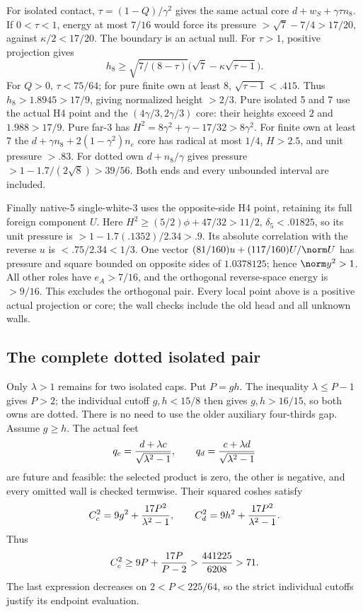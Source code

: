 For isolated contact, \(\tau=(1-Q)/\gamma^2\) gives the same
actual core \(d+w_S+\gamma\tau n_8\).
If \(0<\tau<1\), energy at most \(7/16\) would force its
pressure \(>\sqrt7-7/4>17/20\), against
\(\kappa/2<17/20\).  The boundary is an actual null.
For \(\tau>1\), positive projection gives
\[
 h_8\ge\sqrt{7/(8-\tau)}
               \bigl(\sqrt7-\kappa\sqrt{\tau-1}\bigr).
\]
For \(Q>0\), \(\tau<75/64\); for pure finite own at least 8,
\(\sqrt{\tau-1}<.415\).
Thus \(h_8>1.8945>17/9\), giving normalized height \(>2/3\).
Pure isolated 5 and 7 use the actual H4 point and the
\((4\gamma/3,2\gamma/3)\) core: their heights exceed
\(2\) and \(1.988>17/9\).
Pure far-3 has \(H^2=8\gamma^2+\gamma-17/32>8\gamma^2\).
For finite own at least 7 the
\(d+\gamma n_8+2(1-\gamma^2)n_e\) core has radical
at most \(1/4\), \(H>2.5\), and unit pressure \(>.83\).
For dotted own \(d+n_8/\gamma\) gives pressure
\(>1-1.7/(2\sqrt8)>39/56\).
Both ends and every unbounded interval are included.

Finally native-5 single-white-3 uses the opposite-side H4 point,
retaining its full foreign component \(U\).
Here \(H^2\ge(5/2)\phi+47/32>11/2\),
\(\delta_5<.01825\), so its unit pressure is
\(>1-1.7(.1352)/2.34>.9\).
Its absolute correlation with the reverse \(u\) is
\(<.75/2.34<1/3\).
One vector
\((81/160)u+(117/160)U/\norm U\)
has pressure and square bounded on opposite sides of \(1.0378125\);
hence \(\norm y^2>1\).
All other roles have \(e_A>7/16\), and the orthogonal
reverse-space energy is \(>9/16\).
This excludes the orthogonal pair.  Every local point above is
a positive actual projection or core; the wall checks include
the old head and all unknown walls.

\subsection{The complete dotted isolated pair}
\label{app:D18isolateddotted}

Only \(\lambda>1\) remains for two isolated caps.
Put \(P=gh\).  The inequality \(\lambda\le P-1\)
gives \(P>2\); the individual cutoff \(g,h<15/8\)
then gives \(g,h>16/15\), so both owns are dotted.
There is no need to use the older auxiliary four-thirds gap.
Assume \(g\ge h\).
The actual feet
\[
 q_c={d+\lambda c\over\sqrt{\lambda^2-1}},\qquad
 q_d={c+\lambda d\over\sqrt{\lambda^2-1}}
\]
are future and feasible: the selected product is zero, the other
is negative, and every omitted wall is checked termwise.
Their squared coshes satisfy
\[
 C_c^2=9g^2+{17P^2\over\lambda^2-1},\qquad
 C_d^2=9h^2+{17P^2\over\lambda^2-1}.
\]
Thus
\[
 C_c^2\ge9P+{17P\over P-2}
 >{441225\over6208}>71.
\]
The last expression decreases on \(2<P<225/64\), so the strict
individual cutoffs justify its endpoint evaluation.

